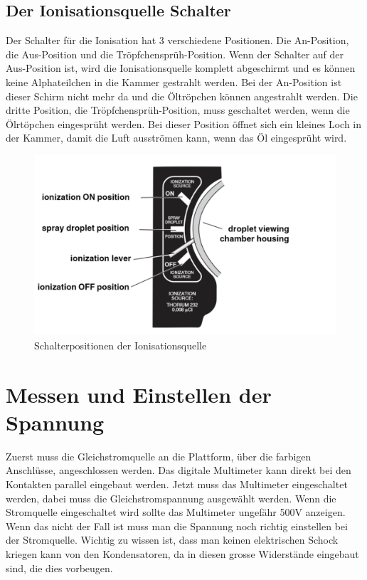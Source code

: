 \subsection{Der Ionisationsquelle Schalter}\label{sub:ionisationquelle}
Der Schalter für die Ionisation hat 3 verschiedene Positionen. Die An-Position, die Aus-Position und die Tröpfchensprüh-Position. Wenn der Schalter auf der Aus-Position ist, wird die Ionisationsquelle komplett abgeschirmt und es können keine Alphateilchen in die Kammer gestrahlt werden. Bei der An-Position ist dieser Schirm nicht mehr da und die Öltröpchen können angestrahlt werden. Die dritte Position, die Tröpfchensprüh-Position, muss geschaltet werden, wenn die Ölrtöpchen eingesprüht werden. Bei dieser Position öffnet sich ein kleines Loch in der Kammer, damit die Luft ausströmen kann, wenn das Öl eingesprüht wird.

\begin{figure}[ht]
	\begin{center}
		\includegraphics[scale=0.5]{bilder/pdf/Schalterfunktionen.pdf}
		\caption{Schalterpositionen der Ionisationsquelle}
		\label{fig:Schalterpositionen}
	\end{center}
\end{figure}

\section{Messen und Einstellen der Spannung}\label{sec:spannung}
Zuerst muss die Gleichstromquelle an die Plattform, über die farbigen Anschlüsse, angeschlossen werden. Das digitale Multimeter kann direkt bei den Kontakten parallel eingebaut werden. Jetzt muss das Multimeter eingeschaltet werden, dabei muss die Gleichstromspannung ausgewählt werden. Wenn die Stromquelle eingeschaltet wird sollte das Multimeter ungefähr 500V anzeigen. Wenn das nicht der Fall ist muss man die Spannung noch richtig einstellen bei der Stromquelle. Wichtig zu wissen ist, dass man keinen elektrischen Schock kriegen kann von den Kondensatoren, da in diesen grosse Widerstände eingebaut sind, die dies vorbeugen.

